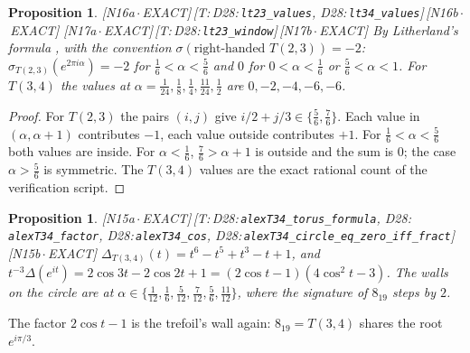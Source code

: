 \documentclass[11pt]{article}
\newtheorem{proposition}[theorem]{Proposition}
\theoremstyle{definition}
\newcommand{\lean}[1]{\texttt{\small #1}}
\newcommand{\dtag}[1]{#1}
\begin{document}
\begin{proposition}\dtag{\textsf{\small[N16a\,$\cdot$\,EXACT]}\,\textsf{\small[T:\,D28:\,\lean{lt23\_\allowbreak{}values}, D28:\,\lean{lt34\_\allowbreak{}values}]}\,\textsf{\small[N16b\,$\cdot$\,EXACT]} \textsf{\small[N17a\,$\cdot$\,EXACT]}\,\textsf{\small[T:\,D28:\,\lean{lt23\_\allowbreak{}window}]}\,\textsf{\small[N17b\,$\cdot$\,EXACT]}}
By Litherland's formula \cite{Litherland}, with the convention $\sigma(\text{right-handed }T(2,3))=-2$: $\sigma_{T(2,3)}(e^{2\pi i\alpha})=-2$ for $\tfrac16<\alpha<\tfrac56$ and $0$ for $0<\alpha<\tfrac16$ or $\tfrac56<\alpha<1$. For $T(3,4)$ the values at $\alpha=\tfrac1{24},\tfrac18,\tfrac14,\tfrac{11}{24},\tfrac12$ are $0,-2,-4,-6,-6$.
\end{proposition}
\begin{proof}
For $T(2,3)$ the pairs $(i,j)$ give $i/2+j/3\in\{\tfrac56,\tfrac76\}$. Each value in $(\alpha,\alpha+1)$ contributes $-1$, each value outside contributes $+1$. For $\tfrac16<\alpha<\tfrac56$ both values are inside. For $\alpha<\tfrac16$, $\tfrac76>\alpha+1$ is outside and the sum is $0$; the case $\alpha>\tfrac56$ is symmetric. The $T(3,4)$ values are the exact rational count of the verification script.
\end{proof}
\begin{proposition}\dtag{\textsf{\small[N15a\,$\cdot$\,EXACT]}\,\textsf{\small[T:\,D28:\,\lean{alexT34\_\allowbreak{}torus\_\allowbreak{}formula}, D28:\,\lean{alexT34\_\allowbreak{}factor}, D28:\,\lean{alexT34\_\allowbreak{}cos}, D28:\,\lean{alexT34\_\allowbreak{}circle\_\allowbreak{}eq\_\allowbreak{}zero\_\allowbreak{}iff\_\allowbreak{}fract}]}\,\textsf{\small[N15b\,$\cdot$\,EXACT]}}
$\Delta_{T(3,4)}(t)=t^6-t^5+t^3-t+1$, and $t^{-3}\Delta(e^{it})=2\cos3t-2\cos2t+1=(2\cos t-1)(4\cos^2t-3)$. The walls on the circle are at $\alpha\in\{\tfrac1{12},\tfrac16,\tfrac5{12},\tfrac7{12},\tfrac56,\tfrac{11}{12}\}$, where the signature of $8_{19}$ steps by $2$.
\end{proposition}
The factor $2\cos t-1$ is the trefoil's wall again: $8_{19}=T(3,4)$ shares the root $e^{i\pi/3}$.
\end{document}
